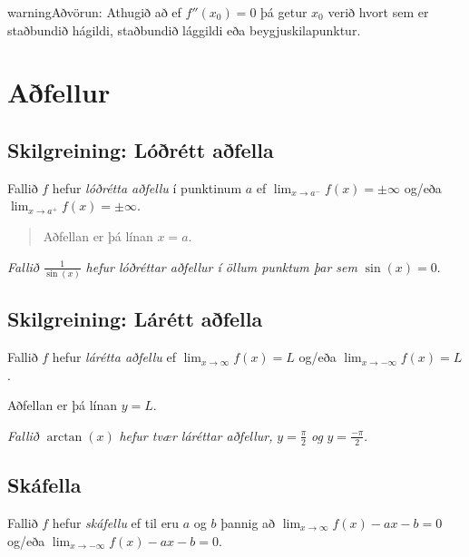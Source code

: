 \documentclass[b5paper,11pt,icelandic]{sphinxmanual}
\begin{document}
\begin{notice}{warning}{Aðvörun:}
Athugið að ef \(f''(x_0)=0\) þá getur \(x_0\) verið hvort sem er
staðbundið hágildi, staðbundið lággildi eða beygjuskilapunktur.
\end{notice}


\section{Aðfellur}
\label{kafli05:afellur}\label{kafli05:index-4}

\subsection{Skilgreining: Lóðrétt aðfella}
\label{kafli05:skilgreining-lorett-afella}
Fallið \(f\) hefur \emph{lóðrétta aðfellu} í punktinum \(a\) ef
\(\lim_{x\to a^-} f(x) = \pm \infty\) og/eða
\(\lim_{x\to a^+} f(x) = \pm \infty\).
\begin{quote}

Aðfellan er þá línan \(x=a\).
\end{quote}


\emph{Fallið} \(\frac{1}{\sin(x)}\) \emph{hefur lóðréttar aðfellur í öllum punktum þar sem} \(\sin(x)=0\).


\subsection{Skilgreining: Lárétt aðfella}
\label{kafli05:skilgreining-larett-afella}
Fallið \(f\) hefur \emph{lárétta aðfellu} ef
\(\lim_{x\to \infty} f(x) = L\) og/eða
\(\lim_{x\to -\infty} f(x) = L\).

Aðfellan er þá línan \(y=L\).


\emph{Fallið} \(\arctan(x)\) \emph{hefur tvær láréttar aðfellur,} \(y=\frac{\pi}{2}\) \emph{og} \(y=\frac{-\pi}{2}\).


\subsection{Skáfella}
\label{kafli05:skafella}
Fallið \(f\) hefur \emph{skáfellu} ef til eru \(a\) og \(b\)
þannig að \(\lim_{x\to \infty} f(x) -ax-b = 0\) og/eða
\(\lim_{x\to -\infty} f(x) -ax-b= 0\).
\end{document}
